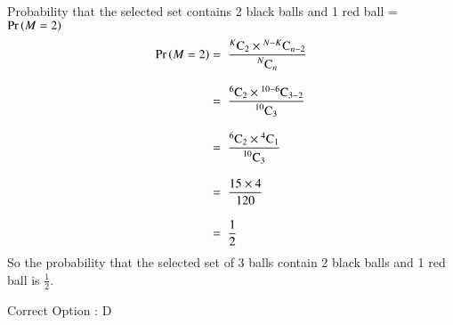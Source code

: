 \documentclass[journal,12pt,twocolumn]{IEEEtran}
\begin{document}
Probability that the selected set contains 2 black balls and 1 red ball = $\Pr\left(M = 2\right)$
\begin{align}
    \Pr\left(M = 2\right) = \hspace{0.2cm}& \frac{{}^{K}\mathrm{C}_{2} \times {}^{N-K}\mathrm{C}_{n-2}}{\displaystyle{{}^{N}\mathrm{C}_{n}}}\\[0.3cm]
               = \hspace{0.2cm}& \frac{{}^{6}\mathrm{C}_{2} \times {}^{10-6}\mathrm{C}_{3-2}}{\displaystyle{{}^{10}\mathrm{C}_{3}}}\\[0.3cm]
               = \hspace{0.2cm}& \frac{{}^{6}\mathrm{C}_{2} \times {}^{4}\mathrm{C}_{1}}{\displaystyle{{}^{10}\mathrm{C}_{3}}}\\[0.3cm]
               = \hspace{0.2cm}& \frac{15 \times 4}{120}\\[0.3cm]
               = \hspace{0.2cm}& \frac{1}{2}
\end{align}
So the probability that the selected set of 3 balls contain 2 black balls and 1 red ball is $\displaystyle{\frac{1}{2}}$.
\begin{center}
    Correct Option : D
\end{center}
\end{document}
